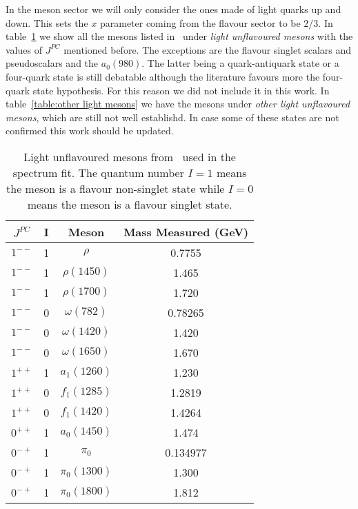 \documentclass[a4paper,12pt]{article}
\begin{document}
In the meson sector we will only consider the ones made of light quarks up and down. This sets the $x$ parameter coming from the flavour sector to be $2/3$. In table~\ref{table:light mesons} we show all the mesons listed in~\cite{pdg_2020} under \textit{light unflavoured mesons} with the values of $J^{PC}$ mentioned before. The exceptions are the flavour singlet scalars and pseudoscalars and the $a_0(980)$. The latter being a quark-antiquark state or a four-quark state is still debatable although the literature favours more the four-quark state hypothesis. For this reason we did not include it in this work. In table~\ref{table:other light mesons} we have the mesons under \textit{other light unflavoured mesons}, which are still not well establishd. In case some of these states are not confirmed this work should be updated.

\begin{table}
\centering
\begin{tabular}{ | c | c | c | c | }
\hline
$J^{PC}$ & I & Meson & Mass Measured (GeV) \\
\hline
$1^{--}$ & 1 & $\rho$ & 0.7755 \\
\hline
$1^{--}$ & 1 &  $\rho(1450)$ & 1.465 \\
\hline
$1^{--}$ & 1 & $\rho(1700)$ & 1.720 \\
\hline
$1^{--}$ & 0 & $\omega(782)$ & 0.78265 \\
\hline
$1^{--}$ & 0 &  $\omega(1420)$ & 1.420 \\
\hline
$1^{--}$ & 0 & $\omega(1650)$ & 1.670 \\
\hline
$1^{++}$ & 1 & $a_1(1260)$ & 1.230\\
\hline
$1^{++}$ & 0 & $f_1(1285)$ & 1.2819\\
\hline
$1^{++}$ & 0 & $f_1(1420)$ & 1.4264\\
\hline
$0^{++}$ & 1 &  $a_0(1450)$ & 1.474 \\
\hline
$0^{-+}$ & 1 &  $\pi_0$ & 0.134977 \\
\hline
$0^{-+}$ & 1 &  $\pi_0(1300)$ & 1.300 \\
\hline
$0^{-+}$ & 1 & $\pi_0(1800)$ & 1.812 \\
\hline
\end{tabular}
\caption{Light unflavoured mesons from~\cite{pdg_2020} used in the spectrum fit. The quantum number $I = 1$ means the meson is a flavour non-singlet state while $I = 0$ means the meson is a flavour singlet state.}
\label{table:light mesons} 
\end{table}
\end{document}
